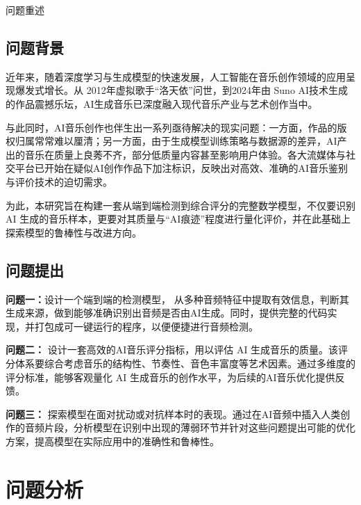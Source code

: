 \documentclass[aspectratio=169]{beamer}
\begin{document}
\begin{frame}{问题重述}
\small
\subsection{问题背景}

近年来，随着深度学习与生成模型的快速发展，人工智能在音乐创作领域的应用呈现爆发式增长。从 2012年虚拟歌手“洛天依”问世，到2024年由 Suno AI技术生成的作品震撼乐坛，AI生成音乐已深度融入现代音乐产业与艺术创作当中。

与此同时，AI音乐创作也伴生出一系列亟待解决的现实问题：一方面，作品的版权归属常常难以厘清；另一方面，由于生成模型训练策略与数据源的差异，AI产出的音乐在质量上良莠不齐，部分低质量内容甚至影响用户体验。各大流媒体与社交平台已开始在疑似AI创作作品下加注标识，反映出对高效、准确的AI音乐鉴别与评价技术的迫切需求。

为此，本研究旨在构建一套从端到端检测到综合评分的完整数学模型，不仅要识别 AI 生成的音乐样本，更要对其质量与“AI痕迹”程度进行量化评价，并在此基础上探索模型的鲁棒性与改进方向。

\subsection{问题提出}
\textbf{问题一：}设计一个端到端的检测模型，
从多种音频特征中提取有效信息，判断其生成来源，做到能够准确识别出音频是否由AI生成。同时，提供完整的代码实现，并打包成可一键运行的程序，以便便捷进行音频检测。

\textbf{问题二：}
设计一套高效的AI音乐评分指标，用以评估 AI 生成音乐的质量。该评分体系要综合考虑音乐的结构性、节奏性、音色丰富度等艺术因素。通过多维度的评分标准，能够客观量化 AI 生成音乐的创作水平，为后续的AI音乐优化提供反馈。

\textbf{问题三：}
探索模型在面对扰动或对抗样本时的表现。通过在AI音频中插入人类创作的音频片段，分析模型在识别中出现的薄弱环节并针对这些问题提出可能的优化方案，提高模型在实际应用中的准确性和鲁棒性。
\end{frame}

\section{问题分析}
\end{document}
